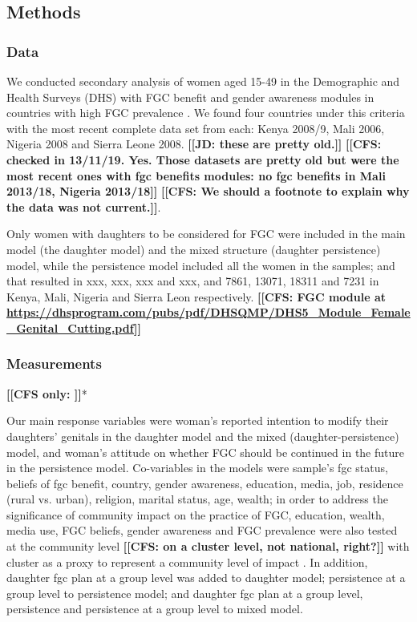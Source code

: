 \documentclass[12pt,]{article}
\newcommand{\comment}[1]{\textbf{[[#1]]}}
\newcommand{\cfcmt}[1]{\comment{CFS: #1}}
\newcommand{\cfonly}[1]{\comment{CFS only: #1}}
\newcommand{\jdcmt}[1]{\comment{JD: #1}}
\begin{document}
\subsection{Methods}\label{methods}

\subsubsection{Data}\label{data}

We conducted secondary analysis of women aged 15-49 in the Demographic and Health Surveys (DHS) with FGC benefit and gender awareness modules in countries with high FGC prevalence \cite{UNIC16}. We found four countries under this criteria with the most recent complete data set from each: Kenya 2008/9, Mali 2006, Nigeria 2008 and Sierra Leone 2008.  \jdcmt{these are pretty old.} \cfcmt{checked in 13/11/19.  Yes.  Those datasets are pretty old but were the most recent ones with fgc benefits modules: no fgc benefits in Mali 2013/18, Nigeria 2013/18} \cfcmt{We should a footnote to explain why the data was not current.}.  

Only women with daughters to be considered for FGC were included in the main model (the daughter model) and the mixed structure (daughter persistence) model, while the persistence model included all the women in the samples; and that resulted in xxx, xxx, xxx and xxx, and 7861, 13071, 18311 and 7231 in Kenya, Mali, Nigeria and Sierra Leon respectively.  \cfcmt{FGC module at \url{https://dhsprogram.com/pubs/pdf/DHSQMP/DHS5_Module_Female_Genital_Cutting.pdf}}

\subsubsection{Measurements}\label{measurements}

\cfonly{\cite{Rima08}}*

Our main response variables were woman's reported intention to modify their daughters’ genitals in the daughter model and the mixed (daughter-persistence) model, and woman's attitude on whether FGC should be continued in the future in the persistence model.  Co-variables in the models were sample’s fgc status, beliefs of fgc benefit, country, gender awareness, education, media, job, residence (rural vs. urban), religion, marital status, age, wealth; in order to address the significance of community impact on the practice of FGC, education, wealth, media use, FGC beliefs, gender awareness and FGC prevalence were also tested at the community level \cfcmt{on a cluster level, not national, right?} with cluster as a proxy to represent a community level of impact \cite{AligRen06, BoylSvec19, Hayf05, Krav02}.  In addition, daughter fgc plan at a group level was added to daughter model; persistence at a group level to persistence model; and daughter fgc plan at a group level, persistence and persistence at a group level to mixed model.
\end{document}
